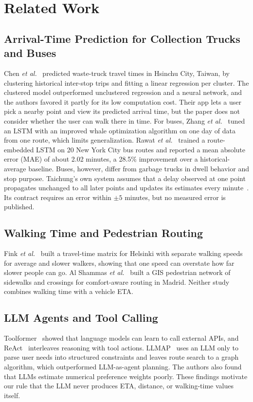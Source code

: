 \section{Related Work}\label{sec:related}

\subsection{Arrival-Time Prediction for Collection Trucks and Buses}
Chen \emph{et al.}~\cite{chen2019travel} predicted waste-truck travel
times in Hsinchu City, Taiwan, by clustering historical inter-stop trips
and fitting a linear regression per cluster. The clustered model
outperformed unclustered regression and a neural network, and the authors
favored it partly for its low computation cost. Their app lets a user
pick a nearby point and view its predicted arrival time, but the paper
does not consider whether the user can walk there in time. For buses, Zhang
\emph{et al.}~\cite{zhang2024bus} tuned an LSTM with an improved whale
optimization algorithm on one day of data from one route, which limits
generalization. Rawat \emph{et al.}~\cite{rawat2026bus} trained a
route-embedded LSTM on 20 New York City bus routes and reported a mean
absolute error (MAE) of about 2.02 minutes, a 28.5\% improvement over a
historical-average baseline. Buses, however, differ from garbage trucks
in dwell behavior and stop purpose. Taichung's own system assumes that a
delay observed at one point propagates unchanged to all later points and
updates its estimates every minute~\cite{tcepb2022report}. Its contract
requires an error within $\pm5$ minutes, but no measured error is
published.

\subsection{Walking Time and Pedestrian Routing}
Fink \emph{et al.}~\cite{fink2024travel} built a travel-time matrix for
Helsinki with separate walking speeds for average and slower walkers,
showing that one speed can overstate how far slower people can go. Al
Shammas \emph{et al.}~\cite{alshammas2023gis} built a GIS pedestrian
network of sidewalks and crossings for comfort-aware routing in Madrid.
Neither study combines walking time with a vehicle ETA.

\subsection{LLM Agents and Tool Calling}
Toolformer~\cite{schick2023toolformer} showed that language models can
learn to call external APIs, and ReAct~\cite{yao2023react} interleaves
reasoning with tool actions. LLMAP~\cite{yuan2025llmap} uses an LLM only
to parse user needs into structured constraints and leaves route search
to a graph algorithm, which outperformed LLM-as-agent planning. The
authors also found that LLMs estimate numerical preference weights
poorly. These findings motivate our rule that the LLM never produces ETA,
distance, or walking-time values itself.

